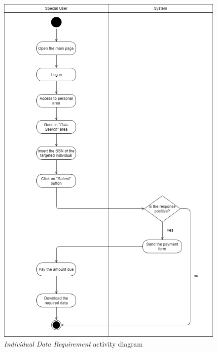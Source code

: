 \begin{figure}[H]
\begin{center}
  \includegraphics[height=0.6\paperheight]{img/activity/IndividualDataSearch.png}
  \hspace{0.05\linewidth}
  \centering
  \caption{\textit{Individual Data Requirement} activity diagram}
  \label{img:individualDataRequirementActivityDiagram}
\end{center}
\end{figure}

